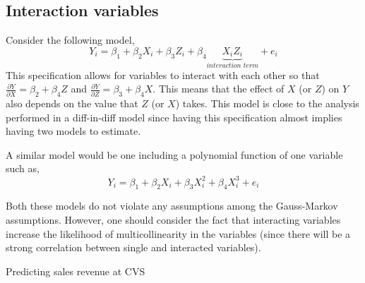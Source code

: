 \subsection{Interaction variables}

Consider the following model, $$Y_i = \beta_1 + \beta_2 X_i + \beta_3 Z_i + \beta_4 \underbrace{X_iZ_i}_{\textit{interaction term}} + e_i $$ This specification allows for variables to interact with each other so that $\frac{\partial Y}{\partial X} = \beta_2 + \beta_4 Z$ and $\frac{\partial Y}{\partial Z} = \beta_3 + \beta_4 X$. This means that the effect of $X$ (or $Z$) on $Y$ also depends on the value that $Z$ (or $X$) takes. This model is close to the analysis performed in a diff-in-diff model since having this specification almost implies having two models to estimate.

A similar model would be one including a polynomial function of one variable such as, $$Y_i = \beta_1 + \beta_2 X_i + \beta_3 X_i^2 + \beta_4 X_i^3 + e_i $$

Both these models do not violate any assumptions among the Gauss-Markov assumptions. However, one should consider the fact that interacting variables increase the likelihood of multicollinearity in the variables (since there will be a strong correlation between single and interacted variables).

\begin{bclogo}[couleur=blue!10, arrondi=0.1, logo=,ombre=false]{ Predicting sales revenue at CVS} 
\begin{small}

\end{small}
\end{bclogo}